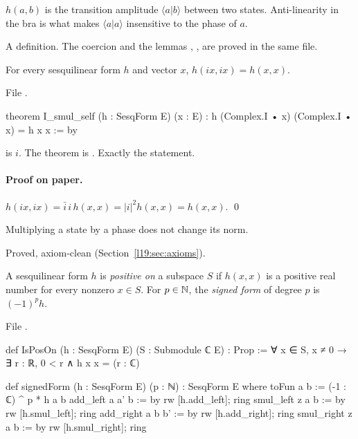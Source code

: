 \begin{physics}
$h(a,b)$ is the transition amplitude $\langle a|b\rangle$ between two states. Anti-linearity in the
bra is what makes $\langle a|a\rangle$ insensitive to the phase of $a$.
\end{physics}

\begin{status}
A definition. The coercion and the lemmas , ,
 are proved in the same file.
\end{status}

\begin{theorem}\label{l19:thm:ismul}
For every sesquilinear form $h$ and vector $x$, $h(ix,ix) = h(x,x)$.
\end{theorem}

\noindent File .
\begin{leancode}
theorem I_smul_self (h : SesqForm E) (x : E) :
    h (Complex.I • x) (Complex.I • x) = h x x := by
\end{leancode}

\begin{dictionary}
 is $i$. The theorem is . Exactly the statement.
\end{dictionary}

\paragraph{Proof on paper.} $h(ix,ix) = \bar i\,i\,h(x,x) = |i|^2h(x,x) = h(x,x)$. \qed

\begin{physics}
Multiplying a state by a phase does not change its norm.
\end{physics}

\begin{status}
Proved, axiom-clean (Section~\ref{l19:sec:axioms}).
\end{status}

\begin{definition}\label{l19:def:isposon}
A sesquilinear form $h$ is \emph{positive on} a subspace $S$ if $h(x,x)$ is a positive real number
for every nonzero $x\in S$. For $p\in{\mathbb{N}}$, the \emph{signed form} of degree $p$ is $(-1)^ph$.
\end{definition}

\noindent File .
\begin{leancode}
def IsPosOn (h : SesqForm E) (S : Submodule ℂ E) : Prop :=
  ∀ x ∈ S, x ≠ 0 → ∃ r : ℝ, 0 < r ∧ h x x = (r : ℂ)

def signedForm (h : SesqForm E) (p : ℕ) : SesqForm E where
  toFun a b := (-1 : ℂ) ^ p * h a b
  add_left a a' b := by rw [h.add_left]; ring
  smul_left z a b := by rw [h.smul_left]; ring
  add_right a b b' := by rw [h.add_right]; ring
  smul_right z a b := by rw [h.smul_right]; ring
\end{leancode}


